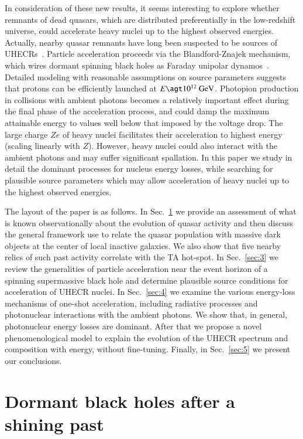 \documentclass[aps,prd,twocolumn,superscriptaddress,tightenlines,nofootinbib]{revtex4-1}
\begin{document}
In consideration of these new results, it seems interesting to explore
whether remnants of dead quasars, which are distributed preferentially
in the low-redshift universe, could accelerate heavy nuclei up to the
highest observed energies.  Actually, nearby quasar remnants have long
been suspected to be sources of
UHECRs~\cite{Boldt:1999ge,Boldt:2000dx,Torres:2002bb,Neronov:2007mh}.  Particle
acceleration proceeds via the Blandford-Znajek mechanism, which wires
 dormant spinning black holes as  Faraday unipolar
dynamos~\cite{Blandford:1977ds,Znajek}. Detailed modeling with
reasonable assumptions on source parameters suggests that protons can
be efficiently launched at $E \agt 10^{12}~{\rm GeV}$.  Photopion
production in collisions with ambient photons becomes a relatively
important effect during the final phase of the acceleration process,
and could damp the maximum attainable energy to values well below that
imposed by the voltage drop. The large charge $Ze$ of heavy nuclei
facilitates their acceleration to highest energy (scaling linearly
with $Z$). However, heavy nuclei could also interact with the ambient
photons and may suffer significant spallation. In this paper we
study in detail the dominant processes for nucleus energy losses,
while searching for plausible source parameters which may allow
acceleration of heavy nuclei up to the highest observed energies.


The layout of the paper is as follows. In Sec.~\ref{sec:2} we provide
an assessment of what is known observationally about the evolution of
quasar activity and then discuss the general framework use to relate
the quasar population with massive dark objects at the center of local
inactive galaxies. We also show that five nearby relics of such past
activity correlate with the TA hot-spot. In Sec.~\ref{sec:3} we review
the generalities of particle acceleration near the event horizon of a
spinning supermassive black hole and determine plausible source
conditions for acceleration of UHECR nuclei. In Sec.~\ref{sec:4} we
examine the various energy-loss mechanisms of one-shot acceleration,
including radiative processes and photonuclear interactions with the
ambient photons. We show that, in general, photonuclear energy losses
are dominant. After that we propose a novel  phenomenological model to
explain the evolution of the UHECR spectrum and composition
with energy, without fine-tuning. Finally, in Sec.~\ref{sec:5} we
present our conclusions.




\section{Dormant black holes after a shining past}
\label{sec:2}
\end{document}
